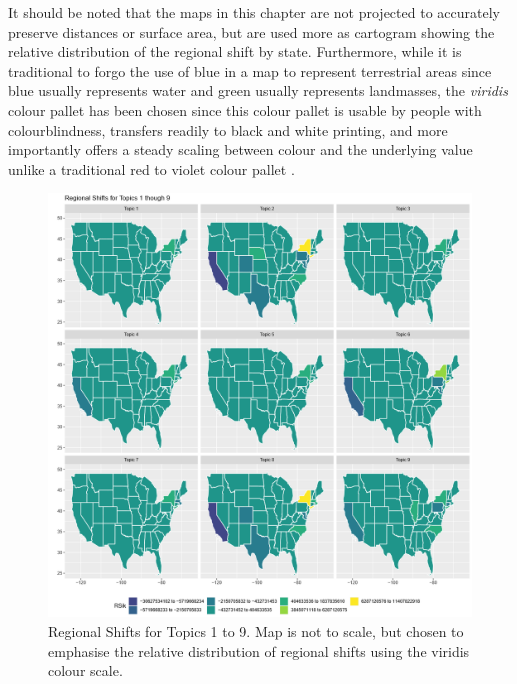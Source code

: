 It should be noted that the maps in this chapter are not projected to accurately preserve distances or surface area, but are used more as cartogram showing the relative distribution of the regional shift by state.  Furthermore, while it is traditional to forgo the use of blue in a map to represent terrestrial areas since blue usually represents water and green usually represents landmasses, the \textit{viridis} colour pallet has been chosen since this colour pallet is usable by people with colourblindness, transfers readily to black and white printing, and more importantly offers a steady scaling between colour and the underlying value unlike a traditional red to violet colour pallet \citep{viridis2018}.    

\begin{figure}
	\centering
	\includegraphics[width=1\linewidth]{Figures/ChapterV/States_01_09}
	\caption[Regional Shifts for Topics 1 to 9]{Regional Shifts for Topics 1 to 9.  Map is not to scale, but chosen to emphasise the relative distribution of regional shifts using the viridis colour scale.}
	\label{fig:states0109}
\end{figure}

